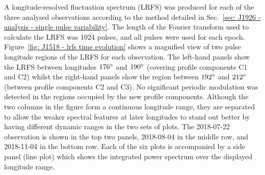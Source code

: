 A longitude-resolved fluctuation spectrum (LRFS) was produced for each of the three analysed observations according to the method detailed in Sec.~\ref{sec: J1926 - analysis - single pulse variability}. The length of the Fourier transform used to calculate the LRFS was 1024 pulses, and all pulses were used for each epoch. Figure~\ref{fig: J1518 - lrfs time evolution} shows a magnified view of two pulse longitude regions of the LRFS for each observation.
The left-hand panels show the LRFS between longitudes $176^\circ$ and $190^\circ$ (covering profile components C1 and C2) whilst the right-hand panels show the region between $192^\circ$ and $212^\circ$ (between profile components C2 and C3). No significant periodic modulation was detected in the regions occupied by the new profile components. Although the two columns in the figure form a continuous longitude range, they are separated to allow the weaker spectral features at later longitudes to stand out better by having different dynamic ranges in the two sets of plots. The 2018-07-22 observation is shown in the top two panels, 2018-08-04 in the middle row, and 2018-11-04 in the bottom row. Each of the six plots is accompanied by a side panel (line plot) which shows the integrated power spectrum over the displayed longitude range.

